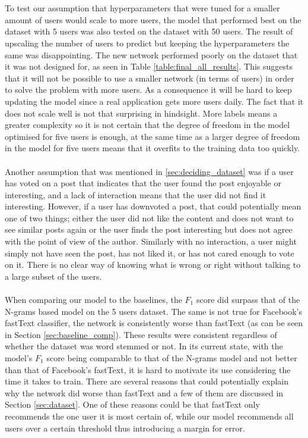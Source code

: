 \\\\
To test our assumption that hyperparameters that were tuned for a smaller amount of users would scale to more users, the model that performed best on the dataset with 5 users was also tested on the dataset with 50 users. The result of upscaling the number of users to predict but keeping the hyperparameters the same was disappointing. The new network performed poorly on the dataset that it was not designed for, as seen in Table \ref{table:final_all_results}. This suggests that it will not be possible to use a smaller network (in terms of users) in order to solve the problem with more users. As a consequence it will be hard to keep updating the model since a real application gets more users daily. The fact that it does not scale well is not that surprising in hindsight. More labels means a greater complexity so it is not certain that the degree of freedom in the model optimised for five users is enough, at the same time as a larger degree of freedom in the model for five users means that it overfits to the training data too quickly.
\\\\
Another assumption that was mentioned in \ref{sec:deciding_dataset} was if a user has voted on a post that indicates that the user found the post enjoyable or interesting, and a lack of interaction means that the user did not find it interesting. However, if a user has downvoted a post, that could potentially mean one of two things; either the user did not like the content and does not want to see similar posts again or the user finds the post interesting but does not agree with the point of view of the author. Similarly with no interaction, a user might simply not have seen the post, has not liked it, or has not cared enough to vote on it. There is no clear way of knowing what is wrong or right without talking to a large subset of the users.
\\\\
When comparing our model to the baselines, the $F_1$ score did surpass that of the N-grams based model on the 5 users dataset. The same is not true for Facebook's fastText classifier, the network is consistently worse than fastText (as can be seen in Section \ref{sec:baseline_comp}). These results were consistent regardless of whether the dataset was word stemmed or not. In its current state, with the model's $F_1$ score being comparable to that of the N-grams model and not better than that of Facebook's fastText, it is hard to motivate its use considering the time it takes to train. There are several reasons that could potentially explain why the network did worse than fastText and a few of them are discussed in Section \ref{sec:dataset}. One of these reasons could be that fastText only recommends the one user it is most certain of, while our model recommends all users over a certain threshold thus introducing a margin for error.

